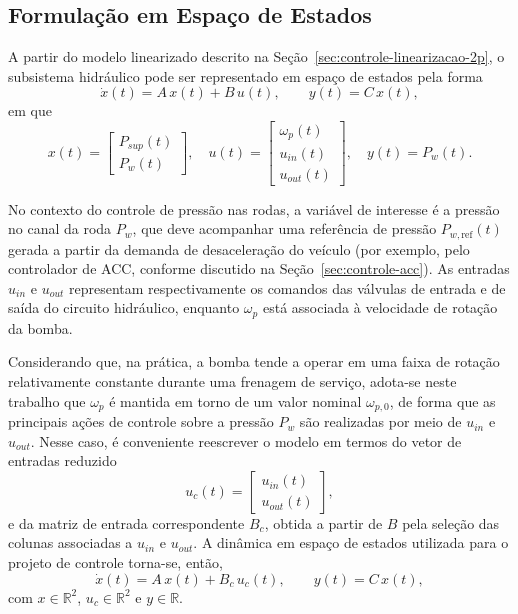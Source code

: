 \subsection{Formulação em Espaço de Estados}
\label{sec:controle-formulacao-espaço-estados}
A partir do modelo linearizado descrito na Seção~\ref{sec:controle-linearizacao-2p}, o subsistema hidráulico pode ser representado em espaço de estados pela forma
\[
    \dot{x}(t) = A\,x(t) + B\,u(t), \qquad
    y(t) = C\,x(t),
\]
em que
\[
    x(t) = 
    \begin{bmatrix}
        P_{sup}(t) \\
        P_{w}(t)
    \end{bmatrix},
    \quad
    u(t) =
    \begin{bmatrix}
        \omega_p(t) \\
        u_{in}(t) \\
        u_{out}(t)
    \end{bmatrix},
    \quad
    y(t) = P_w(t).
\]

No contexto do controle de pressão nas rodas, a variável de interesse é a pressão no canal da roda $P_w$, que deve acompanhar uma referência de pressão $P_{w,\text{ref}}(t)$ gerada a partir da demanda de desaceleração do veículo (por exemplo, pelo controlador de ACC, conforme discutido na Seção~\ref{sec:controle-acc}). As entradas $u_{in}$ e $u_{out}$ representam respectivamente os comandos das válvulas de entrada e de saída do circuito hidráulico, enquanto $\omega_p$ está associada à velocidade de rotação da bomba.

Considerando que, na prática, a bomba tende a operar em uma faixa de rotação relativamente constante durante uma frenagem de serviço, adota-se neste trabalho que $\omega_p$ é mantida em torno de um valor nominal $\omega_{p,0}$, de forma que as principais ações de controle sobre a pressão $P_w$ são realizadas por meio de $u_{in}$ e $u_{out}$. Nesse caso, é conveniente reescrever o modelo em termos do vetor de entradas reduzido
\[
    u_c(t) =
    \begin{bmatrix}
        u_{in}(t) \\
        u_{out}(t)
    \end{bmatrix},
\]
e da matriz de entrada correspondente $B_c$, obtida a partir de $B$ pela seleção das colunas associadas a $u_{in}$ e $u_{out}$. A dinâmica em espaço de estados utilizada para o projeto de controle torna-se, então,
\[
    \dot{x}(t) = A\,x(t) + B_c\,u_c(t), \qquad
    y(t) = C\,x(t),
\]
com $x \in \mathbb{R}^2$, $u_c \in \mathbb{R}^2$ e $y \in \mathbb{R}$.

